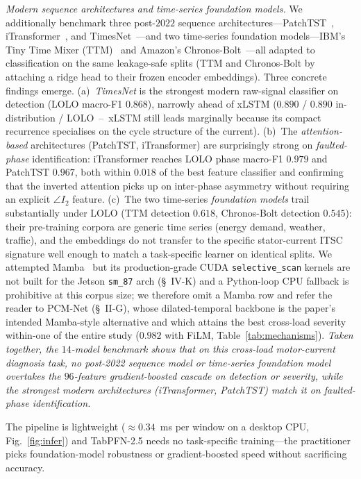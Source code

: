 \documentclass[journal]{IEEEtran}
\begin{document}
\emph{Modern sequence architectures and time-series foundation models.} We additionally
benchmark three post-$2022$ sequence architectures---PatchTST~\cite{nie2023patchtst},
iTransformer~\cite{liu2024itransformer}, and TimesNet~\cite{wu2023timesnet}---and two
time-series foundation models---IBM's Tiny Time Mixer (TTM)~\cite{ekambaram2024ttm} and
Amazon's Chronos-Bolt~\cite{ansari2024chronos}---all adapted to classification on the
same leakage-safe splits (TTM and Chronos-Bolt by attaching a ridge head to their frozen
encoder embeddings). Three concrete findings emerge. (a)~\emph{TimesNet} is the strongest
modern raw-signal classifier on detection (LOLO macro-F1 $0.868$), narrowly ahead of
xLSTM ($0.890$ / $0.890$ in-distribution / LOLO~--~xLSTM still leads marginally because
its compact recurrence specialises on the cycle structure of the current). (b)~The
\emph{attention-based} architectures (PatchTST, iTransformer) are surprisingly strong on
\emph{faulted-phase} identification: iTransformer reaches LOLO phase macro-F1 $0.979$
and PatchTST $0.967$, both within $0.018$ of the best feature classifier and confirming
that the inverted attention picks up on inter-phase asymmetry without requiring an
explicit $\angle I_2$ feature. (c)~The two time-series \emph{foundation models} trail
substantially under LOLO (TTM detection $0.618$, Chronos-Bolt detection $0.545$): their
pre-training corpora are generic time series (energy demand, weather, traffic), and the
embeddings do not transfer to the specific stator-current ITSC signature well enough to
match a task-specific learner on identical splits. We attempted Mamba~\cite{gu2023} but
its production-grade CUDA \texttt{selective\_scan} kernels are not built for the Jetson
\texttt{sm\_87} arch (\S~IV-K) and a Python-loop CPU fallback is prohibitive at this
corpus size; we therefore omit a Mamba row and refer the reader to PCM-Net (\S~II-G),
whose dilated-temporal backbone is the paper's intended Mamba-style alternative and which
attains the best cross-load severity within-one of the entire study ($0.982$ with FiLM,
Table~\ref{tab:mechanisms}). \emph{Taken together, the $14$-model benchmark shows that on
this cross-load motor-current diagnosis task, no post-2022 sequence model or time-series
foundation model overtakes the $96$-feature gradient-boosted cascade on detection or
severity, while the strongest modern architectures (iTransformer, PatchTST) match it on
faulted-phase identification.}

The pipeline is lightweight ($\approx 0.34$~ms per window on a desktop CPU,
Fig.~\ref{fig:infer}) and TabPFN-2.5 needs no task-specific training---the practitioner
picks foundation-model robustness or gradient-boosted speed without sacrificing accuracy.
\end{document}

